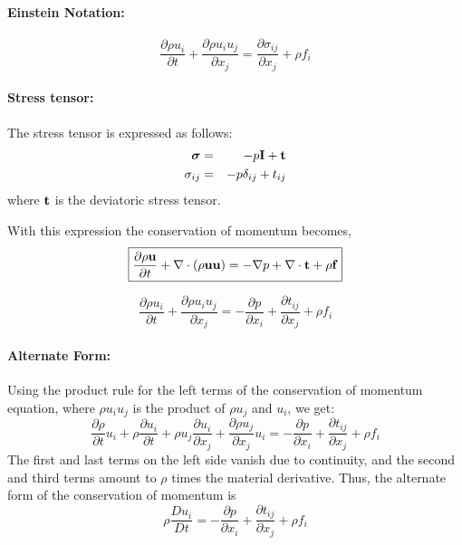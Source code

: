 \documentclass[oneside,a4paper,11pt]{report}
\begin{document}
\paragraph{Einstein Notation:}
\begin{equation}
\frac{\partial \rho u_i}{\partial t}+\frac{\partial \rho u_i u_j}{\partial x_j} = \frac{\partial \sigma_{ij}}{\partial x_j} + \rho f_i
\end{equation}

\paragraph{Stress tensor:}
The stress tensor is expressed as follows:
\begin{eqnarray*}
\boldsymbol{\sigma} &=& -p \mathbf{I} + \mathbf{t} \\
\sigma_{ij}&=&-p \delta_{ij}+t_{ij}
\end{eqnarray*}
where $\mathbf{t}$ is the deviatoric stress tensor.
 
With this expression the conservation of momentum becomes,
\begin{equation}
\label{eq:momentum_conservation_vector}
\boxed{\frac{\partial \rho\mathbf{u} }{\partial t} +\nabla \cdot (\rho\mathbf{u} \mathbf{u} ) = -\nabla p + \nabla\cdot \mathbf{t} +\rho \mathbf{f}}
\end{equation}

\begin{equation}
\label{eq:momentum_conservation_tensor}
\boxed{\frac{\partial \rho u_i}{\partial t}+\frac{\partial \rho u_i u_j}{\partial x_j}=-\frac{\partial p}{\partial x_i} + \frac{\partial t_{ij}}{\partial x_j} + \rho f_i} 
\end{equation}

\paragraph{Alternate Form:}
Using the product rule for the left terms of the conservation of momentum equation, where $\rho u_iu_j$ is the product of $\rho u_j$ and $u_i$, we get:
\[\frac{\partial \rho}{\partial t}u_i+\rho\frac{\partial u_i}{\partial t}+\rho u_j\frac{\partial u_i}{\partial x_j}+\frac{\partial \rho u_j}{\partial x_j}u_i=-\frac{\partial p}{\partial x_i} + \frac{\partial t_{ij}}{\partial x_j} + \rho f_i\]
The first and last terms on the left side vanish due to continuity, and the second and third terms amount to $\rho$ times the material derivative. Thus, the alternate form of the conservation of momentum is
\begin{equation}
\label{eq:diff_cons_momentum}
\rho\frac{D u_i}{Dt}=-\frac{\partial p}{\partial x_i} + \frac{\partial t_{ij}}{\partial x_j} + \rho f_i
\end{equation}
\end{document}
